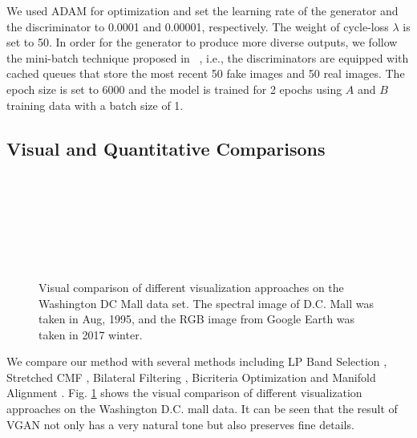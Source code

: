 \documentclass[10pt,conference,a4paper]{IEEEtran}
\begin{document}
We used ADAM for optimization and set the learning rate of the generator and the discriminator to 0.0001 and 0.00001, respectively.
The weight of cycle-loss $\lambda$ is set to 50.
In order for the generator to produce more diverse outputs, we follow the mini-batch technique proposed in ~\cite{traingan2016}, i.e., the discriminators are equipped with cached queues that store the most recent 50 fake images and 50 real images.
The epoch size is set to  6000 and the model is trained for 2 epochs using $A$ and $B$ training data with a batch size of 1.

\subsection{Visual and Quantitative Comparisons}

\begin{figure}[!t]
\centering
{}
\\
\\
\\
\\
\\
\\
\caption{Visual comparison of different visualization approaches on the Washington DC Mall data set.
The spectral image of D.C. Mall was taken in Aug, 1995, and the RGB image from Google Earth was taken in 2017 winter.}
\label{fig:comparison}
\end{figure}


We compare our method with several methods including LP Band Selection \cite{su2014LP}, Stretched CMF \cite{cmf2005}, Bilateral Filtering \cite{kotwal2010visualization}, Bicriteria Optimization \cite{bicriteria2012} and Manifold Alignment \cite{liao2016hscolor}.
Fig. \ref{fig:comparison} shows the visual comparison of different visualization approaches on the Washington D.C. mall data.
It can be seen that the result of VGAN not only has a very natural tone but also preserves fine details.
\end{document}
